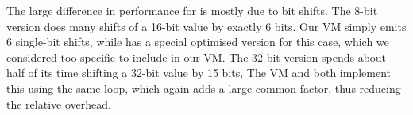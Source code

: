 The large difference in performance for  is mostly due to bit shifts. The 8-bit version does many shifts of a 16-bit value by exactly 6 bits. Our VM simply emits 6 single-bit shifts, while  has a special optimised version for this case, which we considered too specific to include in our VM. The 32-bit version spends about half of its time shifting a 32-bit value by 15 bits, The VM and  both implement this using the same loop, which again adds a large common factor, thus reducing the relative overhead.


%
%
%
%

